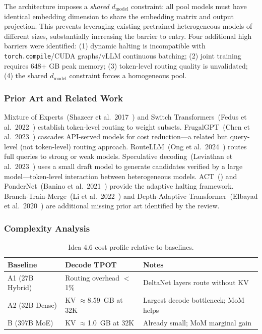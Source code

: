 \documentclass[11pt]{article}
\begin{document}
The architecture imposes a \emph{shared $d_{\text{model}}$} constraint: all pool models must have identical embedding dimension to share the embedding matrix and output projection. This prevents leveraging existing pretrained heterogeneous models of different sizes, substantially increasing the barrier to entry. Four additional high barriers were identified: (1) dynamic halting is incompatible with \texttt{torch.compile}/CUDA graphs/vLLM continuous batching; (2) joint training requires 648+ GB peak memory; (3) token-level routing quality is unvalidated; (4) the shared $d_{\text{model}}$ constraint forces a homogeneous pool.

\subsubsection*{Prior Art and Related Work}

Mixture of Experts~(Shazeer et al.\ 2017~\cite{ShazeerMoE2017}) and Switch Transformers~(Fedus et al.\ 2022~\cite{FedusSwitch2022}) establish token-level routing to weight subsets. FrugalGPT~(Chen et al.\ 2023~\cite{ChenFrugalGPT2023}) cascades API-served models for cost reduction---a related but query-level (not token-level) routing approach. RouteLLM~(Ong et al.\ 2024~\cite{OngRouteLLM2024}) routes full queries to strong or weak models. Speculative decoding~(Leviathan et al.\ 2023~\cite{LeviathanSpeculative2023}) uses a small draft model to generate candidates verified by a large model---token-level interaction between heterogeneous models. ACT~(\cite{GravesACT2016}) and PonderNet~(Banino et al.\ 2021~\cite{BaninoPonderNet2021}) provide the adaptive halting framework. Branch-Train-Merge~(Li et al.\ 2022~\cite{LiBTM2022}) and Depth-Adaptive Transformer~(Elbayad et al.\ 2020~\cite{ElbayadDepthAdaptive2020}) are additional missing prior art identified by the review.

\subsubsection*{Complexity Analysis}

\begin{table}[h]
\centering
\caption{Idea 4.6 cost profile relative to baselines.}
\label{tab:complexity-4-6}
\begin{tabular}{lll}
\toprule
\textbf{Baseline} & \textbf{Decode TPOT} & \textbf{Notes} \\
\midrule
A1 (27B Hybrid) & Routing overhead $<$1\% & DeltaNet layers route without KV \\
A2 (32B Dense) & KV $\approx$8.59~GB at 32K & Largest decode bottleneck; MoM helps \\
B (397B MoE)   & KV $\approx$1.0~GB at 32K & Already small; MoM marginal gain \\
\bottomrule
\end{tabular}
\end{table}
\end{document}
